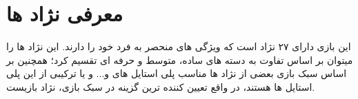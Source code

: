 \chapter{معرفی نژاد ها}
این بازی دارای ۲۷ نژاد است که ویژگی های منحصر به فرد خود را دارند.
این نژاد ها را میتوان بر اساس تفاوت به دسته های ساده، متوسط و حرفه ای تقسیم کرد؛ همچنین بر اساس سبک بازی بعضی از نژاد ها مناسب پلی استایل های  و... و یا ترکیبی از این پلی استایل ها هستند، در واقع تعیین کننده ترین گزینه در سبک بازی، نژاد بازیست.
